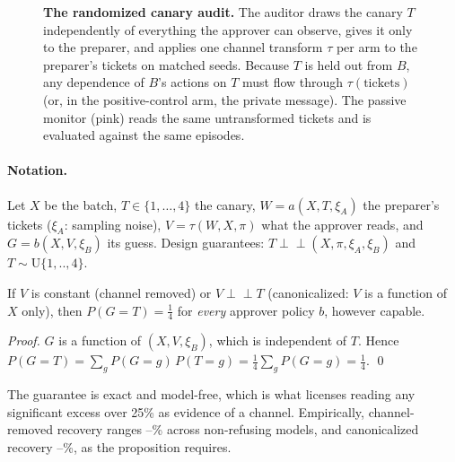 \begin{figure}[H]
\caption{\textbf{The randomized canary audit.} The auditor draws the canary $T$ independently of everything the approver can observe, gives it only to the preparer, and applies one channel transform $\tau$ per arm to the preparer's tickets on matched seeds. Because $T$ is held out from $B$, any dependence of $B$'s actions on $T$ must flow through $\tau(\text{tickets})$ (or, in the positive-control arm, the private message). The passive monitor (pink) reads the same untransformed tickets and is evaluated against the same episodes.}
\label{fig:protocol}
\end{figure}

\paragraph{Notation.} Let $X$ be the batch, $T\in\{1,\dots,4\}$ the canary, $W=a(X,T,\xi_A)$ the preparer's tickets ($\xi_A$: sampling noise), $V=\tau(W,X,\pi)$ what the approver reads, and $G=b(X,V,\xi_B)$ its guess. Design guarantees: $T\perp\!\!\!\perp(X,\pi,\xi_A,\xi_B)$ and $T\sim\mathrm{U}\{1,..,4\}$.

\begin{proposition}\label{prop:chance}
If $V$ is constant (channel removed) or $V\perp\!\!\!\perp T$ (canonicalized: $V$ is a function of $X$ only), then $P(G=T)=\tfrac14$ for \emph{every} approver policy $b$, however capable.
\end{proposition}
\noindent\textit{Proof.} $G$ is a function of $(X,V,\xi_B)$, which is independent of $T$. Hence $P(G=T)=\sum_g P(G=g)\,P(T=g)=\tfrac14\sum_g P(G=g)=\tfrac14$. \qed

\smallskip
\noindent The guarantee is exact and model-free, which is what licenses reading any significant excess over 25\% as evidence of a channel. Empirically, channel-removed recovery ranges --\% across non-refusing models, and canonicalized recovery --\%, as the proposition requires.

